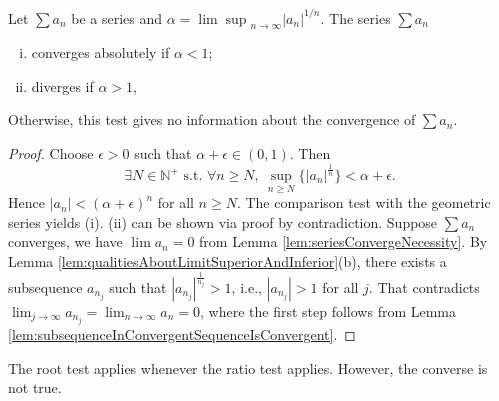 \begin{thm}
  \label{thm:rootTest}
  Let $\sum a_n$ be a series and
  $\alpha={\lim\sup}_{n\rightarrow\infty}|a_n|^{1/n}$.
  The series $\sum a_n$
  \begin{enumerate}[(i)]\itemsep0em
  \item converges absolutely if $\alpha<1$;
  \item diverges if $\alpha>1$,
  \end{enumerate}
  Otherwise, this test gives no information
  about the convergence of $\sum a_n$.
\end{thm}
\begin{proof}
  Choose $\epsilon>0$ such that $\alpha+\epsilon\in (0,1)$.
  Then 
  \begin{displaymath}
    \exists N\in \mathbb{N}^+ \text{ s.t. }
    \forall n\ge N,
    \ \sup_{n\ge N}\{ |a_n|^{\frac{1}{n}}\} < \alpha+\epsilon.
  \end{displaymath}
  Hence $|a_n|<(\alpha+\epsilon)^n$ for all $n\ge N$.
  The comparison test with the geometric series yields (i).
  (ii) can be shown via proof by contradiction.
  Suppose $\sum a_{n}$ converges, we have $\lim a_{n}=0$
  from Lemma \ref{lem:seriesConvergeNecessity}.
  By Lemma \ref{lem:qualitiesAboutLimitSuperiorAndInferior}(b),
  there exists a subsequence $a_{n_{j}}$ such that
  $|a_{n_{j}}|^{\frac{1}{n_{j}}}>1$, i.e., $|a_{n_{j}}|>1$ for all $j$.
  That contradicts
  $\lim_{j\rightarrow\infty} a_{n_{j}}=\lim_{n\rightarrow\infty}a_{n}=0$,
  where the first step follows from
  Lemma \ref{lem:subsequenceInConvergentSequenceIsConvergent}.
\end{proof}

\begin{rem}
  The root test applies whenever the ratio test applies.
  However, the converse is not true.
\end{rem}

